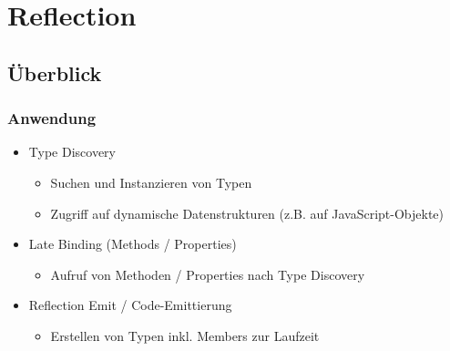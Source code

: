 
\section{Reflection}

\subsection{Überblick}
\subsubsection{Anwendung}
\begin{itemize}
    \item Type Discovery
    \begin{itemize}
        \item Suchen und Instanzieren von Typen
        \item Zugriff auf dynamische Datenstrukturen (z.B. auf JavaScript-Objekte)
    \end{itemize}
    \item Late Binding (Methods / Properties)
    \begin{itemize}
        \item Aufruf von Methoden / Properties nach Type Discovery
    \end{itemize}
    \item Reflection Emit / Code-Emittierung
    \begin{itemize}
        \item Erstellen von Typen inkl. Members zur Laufzeit
    \end{itemize}
\end{itemize}

